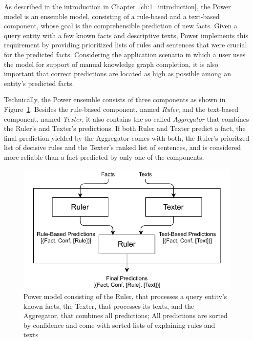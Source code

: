 As described in the introduction in Chapter~\ref{ch:1_introduction}, the Power model is an ensemble model, consisting of a rule-based and a text-based component, whose goal is the comprehensible prediction of new facts. Given a query entity with a few known facts and descriptive texts, Power implements this requirement by providing prioritized lists of rules and sentences that were crucial for the predicted facts. Considering the application scenario in which a user uses the model for support of manual knowledge graph completion, it is also important that correct predictions are located as high as possible among an entity's predicted facts.

Technically, the Power ensemble consists of three components as shown in Figure~\ref{fig:4_approach/power_architecture}. Besides the rule-based component, named \emph{Ruler}, and the text-based component, named \emph{Texter}, it also contains the so-called \emph{Aggregator} that combines the Ruler's and Texter's predictions. If both Ruler and Texter predict a fact, the final prediction yielded by the Aggregator comes with both, the Ruler's prioritzed list of decisive rules and the Texter's ranked list of sentences, and is considered more reliable than a fact predicted by only one of the components.

\begin{figure}[t]
    \centering
    \includegraphics[width=\textwidth]{4_approach/power_architecture}
    \caption{Power model consisting of the Ruler, that processes a query entity's known facts, the Texter, that processes its texts, and the Aggregator, that combines all predictions; All predictions are sorted by confidence and come with sorted lists of explaining rules and texts}
    \label{fig:4_approach/power_architecture}
\end{figure}

